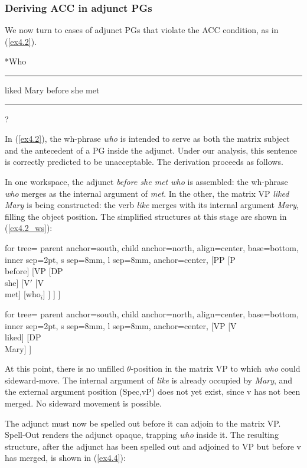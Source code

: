 \documentclass[12pt]{article}
\newcommand{\gap}{\rule{1.25em}{.5pt}} %
\newcommand{\TwoTreeCols}[2]{%
  \noindent\parbox[t]{0.47\linewidth}{#1}%
  \hspace{1.2em}%
  \parbox[t]{0.47\linewidth}{#2}\par
}
\begin{document}
\subsubsection{Deriving ACC in adjunct PGs}

We now turn to cases of adjunct PGs that violate the ACC condition, as in (\ref{ex4.2}).

\ex \label{ex4.2}
*Who \gap{} liked Mary before she met \gap{}?
\xe

\noindent
In (\ref{ex4.2}), the wh-phrase \textit{who} is intended to serve as both the matrix subject and the antecedent of a PG inside the adjunct. Under our analysis, this sentence is correctly predicted to be unacceptable. The derivation proceeds as follows.

In one workspace, the adjunct \textit{before she met who} is assembled: the wh-phrase \textit{who} merges as the internal argument of \textit{met}. In the other, the matrix VP \textit{liked Mary} is being constructed: the verb \textit{like} merges with its internal argument \textit{Mary}, filling the object position. The simplified structures at this stage are shown in (\ref{ex4.2_ws}):

\ex \label{ex4.2_ws}
\TwoTreeCols{%
\begin{forest}
for tree={
  parent anchor=south,
  child anchor=north,
  align=center,
  base=bottom,
  inner sep=2pt,
  s sep=8mm,
  l sep=8mm,
  anchor=center,
}
[PP
  [P\\before]
  [VP
    [DP\\she]
    [V$'$
      [V\\met]
      [who$_i$]
    ]
  ]
]
\end{forest}%
}{%
\begin{forest}
for tree={
  parent anchor=south,
  child anchor=north,
  align=center,
  base=bottom,
  inner sep=2pt,
  s sep=8mm,
  l sep=8mm,
  anchor=center,
}
[VP
  [V\\liked]
  [DP\\Mary]
]
\end{forest}%
}
\xe

\noindent
At this point, there is no unfilled $\theta$-position in the matrix VP to which \textit{who} could sideward-move. The internal argument of \textit{like} is already occupied by \textit{Mary}, and the external argument position (Spec,vP) does not yet exist, since v has not been merged. No sideward movement is possible.

The adjunct must now be spelled out before it can adjoin to the matrix VP. Spell-Out renders the adjunct opaque, trapping \textit{who} inside it. The resulting structure, after the adjunct has been spelled out and adjoined to VP but before v has merged, is shown in (\ref{ex4.4}):
\end{document}
